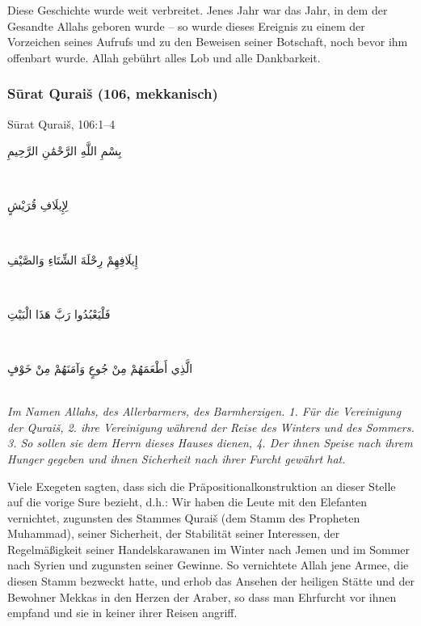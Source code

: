\begin{merke}
Diese Geschichte wurde weit verbreitet. Jenes Jahr war das Jahr, in dem der Gesandte Allahs
 geboren wurde – so wurde dieses Ereignis zu einem der Vorzeichen seines Aufrufs und zu
den Beweisen seiner Botschaft, noch bevor ihm offenbart wurde. Allah gebührt alles Lob und
alle Dankbarkeit.
\end{merke}

\subsubsection*{Sūrat Quraiš (106, mekkanisch)}

\begin{quranvers}{Sūrat Quraiš, 106:1--4}
{\quranfont\begin{Arabic}
بِسْمِ اللَّهِ الرَّحْمَٰنِ الرَّحِيمِ
\end{Arabic}}\\[2mm]
{\quranfont\begin{Arabic}
لِإِيلَافِ قُرَيْشٍ
\end{Arabic}}\\[2mm]
{\quranfont\begin{Arabic}
إِيلَافِهِمْ رِحْلَةَ الشِّتَاءِ وَالصَّيْفِ
\end{Arabic}}\\[2mm]
{\quranfont\begin{Arabic}
فَلْيَعْبُدُوا رَبَّ هَذَا الْبَيْتِ
\end{Arabic}}\\[2mm]
{\quranfont\begin{Arabic}
الَّذِي أَطْعَمَهُمْ مِنْ جُوعٍ وَآمَنَهُمْ مِنْ خَوْفٍ
\end{Arabic}}\\[3mm]
\emph{Im Namen Allahs, des Allerbarmers, des Barmherzigen. 1. Für die Vereinigung der Quraiš,
2. ihre Vereinigung während der Reise des Winters und des Sommers. 3. So sollen sie dem
Herrn dieses Hauses dienen, 4. Der ihnen Speise nach ihrem Hunger gegeben und ihnen
Sicherheit nach ihrer Furcht gewährt hat.}
\end{quranvers}

Viele Exegeten sagten, dass sich die Präpositionalkonstruktion an dieser Stelle auf die vorige
Sure bezieht, d.h.: Wir haben die Leute mit den Elefanten vernichtet, zugunsten des Stammes
Quraiš (dem Stamm des Propheten Muhammad), seiner Sicherheit, der Stabilität seiner
Interessen, der Regelmäßigkeit seiner Handelskarawanen im Winter nach Jemen und im Sommer
nach Syrien und zugunsten seiner Gewinne. So vernichtete Allah jene Armee, die diesen Stamm
bezweckt hatte, und erhob das Ansehen der heiligen Stätte und der Bewohner Mekkas in den
Herzen der Araber, so dass man Ehrfurcht vor ihnen empfand und sie in keiner ihrer Reisen
angriff.

